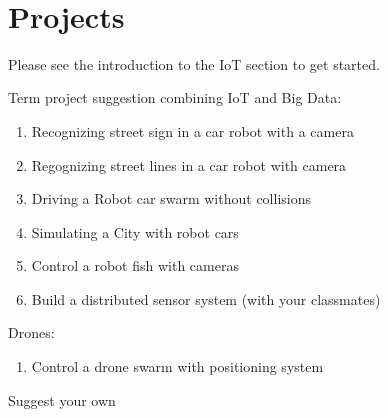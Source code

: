\FILENAME\

\chapter{Projects}\label{projects}

Please see the introduction to the IoT section to get started.

Term project suggestion combining IoT and Big Data:

\begin{enumerate}
\def\labelenumi{\arabic{enumi}.}

\item
  Recognizing street sign in a car robot with a camera
\item
  Regognizing street lines in a car robot with camera
\item
  Driving a Robot car swarm without collisions
\item
  Simulating a City with robot cars
\item
  Control a robot fish with cameras
\item
  Build a distributed sensor system (with your classmates)
\end{enumerate}

Drones:

\begin{enumerate}
\def\labelenumi{\arabic{enumi}.}

\item
  Control a drone swarm with positioning system
\end{enumerate}

Suggest your own

